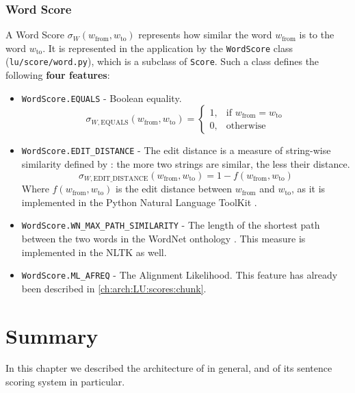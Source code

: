 \subsubsection{Word Score} \label{ch:arch:LU:scores:word}
A Word Score $\sigma_W(w_\text{from},w_\text{to})$ represents how similar the word $w_\text{from}$ is to the word $w_\text{to}$. It is represented in the application by the \texttt{WordScore} class (\texttt{lu/score/word.py}), which is a subclass of \texttt{Score}. Such a class defines the following \textbf{four features}:
\begin{itemize}
	\item \texttt{WordScore.EQUALS} - Boolean equality.
	\begin{displaymath}
		\sigma_{W,\text{EQUALS}}(w_\text{from},w_\text{to}) = \begin{cases} 1, & \mbox{if } w_\text{from} = w_\text{to} \\
		                                                                    0, & \mbox{otherwise} \end{cases}
	\end{displaymath}
	
	\item \texttt{WordScore.EDIT\_DISTANCE} - The edit distance is a measure of string-wise similarity defined by \cite{levelshtein-66-binary}: the more two strings are similar, the less their distance.
	\begin{displaymath}
		\sigma_{W,\text{EDIT\_DISTANCE}}(w_\text{from},w_\text{to}) = 1-f(w_\text{from},w_\text{to})
	\end{displaymath}
	Where $f(w_\text{from},w_\text{to})$ is the edit distance between $w_\text{from}$ and $w_\text{to}$, as it is implemented in the Python Natural Language ToolKit \citep{Loper:2002:NNL:1118108.1118117}.
	
	\item \texttt{WordScore.WN\_MAX\_PATH\_SIMILARITY} - The length of the shortest path between the two words in the WordNet onthology \citep{Miller:1995:WLD:219717.219748}. This measure is implemented in the NLTK as well.
	
	\item \texttt{WordScore.ML\_AFREQ} - The Alignment Likelihood. This feature has already been described in \ref{ch:arch:LU:scores:chunk}.
\end{itemize}

\section{Summary}
In this chapter we described the architecture of \pname in general, and of its sentence scoring system in particular.

